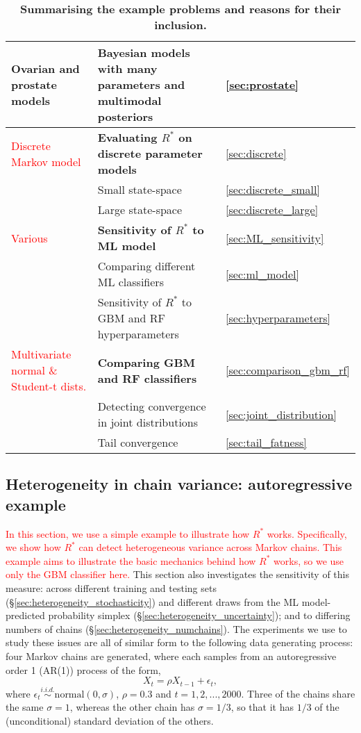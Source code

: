 \documentclass{article}
\begin{document}
\begin{table}[]
\begin{tabular}{l|l|l}
		\midrule
		Ovarian and prostate models & \textbf{Bayesian models with many parameters and multimodal posteriors} & \ref{sec:prostate}\\
		\midrule		
		\textcolor{red}{Discrete Markov model} & \textbf{Evaluating $R^*$ on discrete parameter models} & \ref{sec:discrete}\\
		& Small state-space & \ref{sec:discrete_small}\\
		& Large state-space & \ref{sec:discrete_large}\\
		\midrule
		\textcolor{red}{Various} & \textbf{Sensitivity of $R^*$ to ML model} & \ref{sec:ML_sensitivity}\\
		& Comparing different ML classifiers & \ref{sec:ml_model}\\
		& Sensitivity of $R^*$ to GBM and RF hyperparameters & \ref{sec:hyperparameters}\\
		\midrule
		\textcolor{red}{Multivariate normal \& Student-t dists.} & \textbf{Comparing GBM and RF classifiers} & \ref{sec:comparison_gbm_rf}\\
		& Detecting convergence in joint distributions & \ref{sec:joint_distribution}\\
		& Tail convergence & \ref{sec:tail_fatness}\\
	\end{tabular}\caption{\textbf{Summarising the example problems and reasons for their inclusion.}}\label{tab:results}
\end{table}

\subsection{Heterogeneity in chain variance: autoregressive example}\label{sec:heterogeneity}
\textcolor{red}{In this section, we use a simple example to illustrate how $R^*$ works. Specifically, we show how $R^*$ can detect heterogeneous variance across Markov chains. This example aims to illustrate the basic mechanics behind how $R^*$ works, so we use only the GBM classifier here.} This section also investigates the sensitivity of this measure: across different training and testing sets (\S\ref{sec:heterogeneity_stochasticity}) and different draws from the ML model-predicted probability simplex (\S\ref{sec:heterogeneity_uncertainty}); and to differing numbers of chains (\S\ref{sec:heterogeneity_numchains}). The experiments we use to study these issues are all of similar form to the following data generating process: four Markov chains are generated, where each samples from an autoregressive order 1 (AR(1)) process of the form,
%
\begin{equation}\label{eq:ar1}
X_t = \rho X_{t-1} + \epsilon_t,
\end{equation}
%
where $\epsilon_t\stackrel{i.i.d.}{\sim}\text{normal}(0, \sigma)$, $\rho=0.3$ and $t=1,2,...,2000$. Three of the chains share the same $\sigma=1$, whereas the other chain has $\sigma=1/3$, so that it has $1/3$ of the (unconditional) standard deviation of the others.
\end{document}
